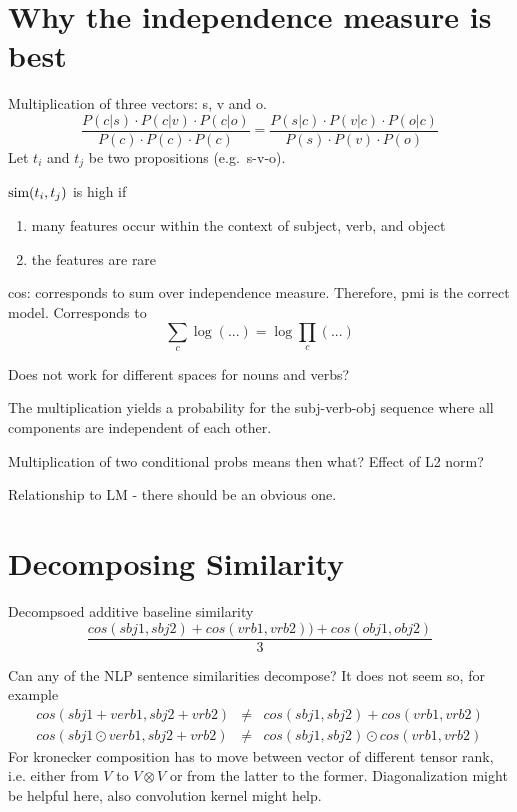 \section{Why the independence measure is best}

Multiplication of three vectors: s, v and o.
\[
\frac{
P(c|s) \cdot P(c|v) \cdot P(c|o)}{
P(c) \cdot P(c) \cdot P(c)} =
\frac{
P(s|c) \cdot P(v|c) \cdot P(o|c)
}{
P(s) \cdot P(v) \cdot P(o)
}
\]
Let $t_i$ and $t_j$ be two propositions
(e.g.~s-v-o).

$\textmd{sim}(t_i,t_j)$ is high if
\begin{enumerate}
\item many features occur within the context of subject, verb, and object
\item the features are rare
\end{enumerate}

cos: corresponds to sum over independence measure.
Therefore, pmi is the correct model.
Corresponds to
\[
\sum_c \log(...) = \log \prod_c(...)
\]



Does not work for different
spaces for nouns and verbs?

The multiplication yields a probability
for the subj-verb-obj sequence where all
components are independent of each other.

Multiplication of two conditional probs means then what?
Effect of L2 norm?


Relationship to LM - there should be an obvious one.


\section{Decomposing Similarity}
Decompsoed additive baseline similarity
\[
\frac{cos(sbj1,sbj2) + cos(vrb1,vrb2)) + cos(obj1,obj2)}{3}
\]

Can any of the NLP sentence similarities decompose? It does not seem so, for example
\begin{eqnarray*}
cos(sbj1+verb1,sbj2+vrb2) &\neq& cos(sbj1, sbj2) + cos(vrb1,vrb2) \\
cos(sbj1\odot verb1,sbj2+vrb2) &\neq& cos(sbj1, sbj2) \odot cos(vrb1,vrb2)
\end{eqnarray*}
For kronecker composition has to move between vector of different tensor rank, i.e. either from $V$ to $V \otimes V$ or from the latter to the former. Diagonalization might be helpful here, also convolution kernel might help. 

